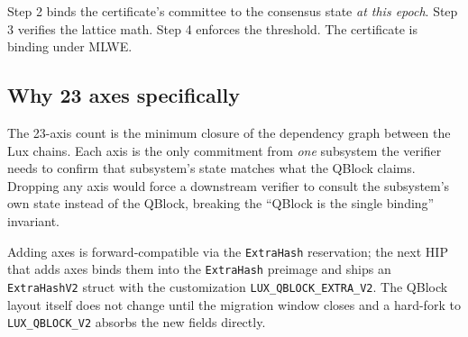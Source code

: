 Step 2 binds the certificate's committee to the consensus state \emph{at
this epoch}. Step 3 verifies the lattice math. Step 4 enforces the
threshold. The certificate is binding under MLWE.

\subsection{Why 23 axes specifically}

The 23-axis count is the minimum closure of the dependency graph between
the Lux chains. Each axis is the only commitment from \emph{one} subsystem
the verifier needs to confirm that subsystem's state matches what the QBlock
claims. Dropping any axis would force a downstream verifier to consult the
subsystem's own state instead of the QBlock, breaking the ``QBlock is the
single binding'' invariant.

Adding axes is forward-compatible via the \texttt{ExtraHash} reservation;
the next HIP that adds axes binds them into the \texttt{ExtraHash} preimage
and ships an \texttt{ExtraHashV2} struct with the customization
\texttt{LUX\_QBLOCK\_EXTRA\_V2}. The QBlock layout itself does not change
until the migration window closes and a hard-fork to \texttt{LUX\_QBLOCK\_V2}
absorbs the new fields directly.
